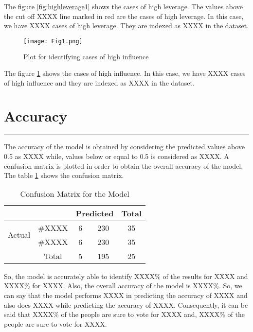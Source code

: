 \documentclass[a4paper,12pt, notitlepage]{article}
\begin{document}
The figure \ref{fig:highleverage1} shows the cases of high leverage. The values above the cut off XXXX line marked in red are the cases of high leverage. In this case, we have XXXX cases of high leverage. They are indexed as XXXX in the dataset.

\begin{figure}[!htbp]
    \centering
    \texttt{[image: Fig1.png]}
    \caption{Plot for identifying cases of high influence}
    \label{fig:highInfluence1}
\end{figure}

The figure \ref{fig:highInfluence1} shows the cases of high influence. In this case, we have XXXX cases of high influence and they are indexed as XXXX in the dataset.

\section{Accuracy}
\rule{\textwidth}{0.5pt}
\par
The accuracy of the model is obtained by considering the predicted values above 0.5 as XXXX while, values below or equal to 0.5 is considered as XXXX. A confusion matrix is plotted in order to obtain the overall accuracy of the model. The table \ref{table:7} shows the confusion matrix.

\begin{table}[!htbp]
\centering
\begin{tabular}{cc|c|c|c|} \cline{3-5}
 & & \multicolumn{2}{c|}{\cellcolor{Gray!50}Predicted} & \cellcolor{Gray!50}Total \\[1ex] \hline
\multicolumn{1}{|c|}{\multirow{2}{*}{ \cellcolor{Gray!50}Actual}} & \#XXXX & 6 & 230 & 35 \\[1ex]
\multicolumn{1}{|c|}{\cellcolor{Gray!50} } & \#XXXX & 6 & 230 & 35 \\[1ex] \hline
\multicolumn{1}{c|}{} & \cellcolor{Gray!50} Total & 5 & 195 & 25 \\[1ex] \cline{2-5}
\end{tabular}
\caption{Confusion Matrix for the Model}
\label{table:7}
\end{table}

So, the model is accurately able to identify XXXX\% of the results for XXXX and XXXX\% for XXXX. Also, the overall accuracy of the model is XXXX\%. So, we can say that the model performs XXXX in predicting the accuracy of XXXX and also does XXXX while predicting the accuracy of XXXX. Consequently, it can be said that XXXX\% of the people are sure to vote for XXXX and, XXXX\% of the people are sure to vote for XXXX.
\end{document}
